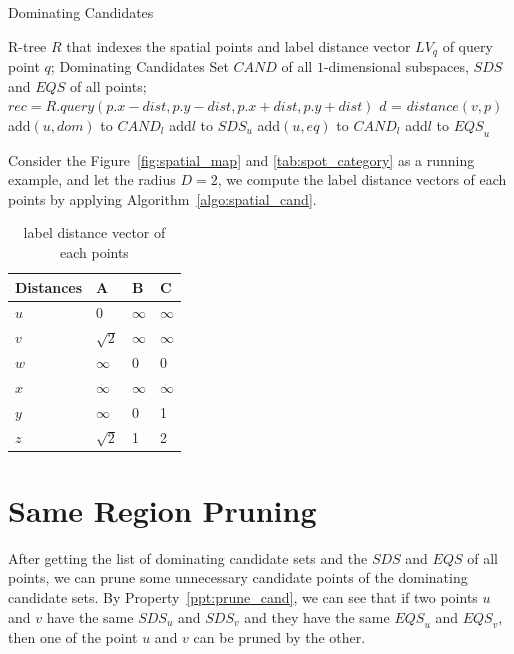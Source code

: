 \begin{algorithm}[H]
  \caption{Dominating Candidates}
  \label{algo:spatial_cand}
  \begin{algorithmic}[1]
  \show\LOOP
    \REQUIRE R-tree $R$ that indexes the spatial points and label distance vector $LV_q$ of query point $q$;
    \ENSURE Dominating Candidates Set $\mathit{CAND}$ of all $1$-dimensional subspaces, $\mathit{SDS}$ and $\mathit{EQS}$ of all points;
            \STATE $rec = R.query(p.x-dist, p.y-dist, p.x+dist, p.y+dist)$
                \STATE $d$ = $distance(v, p)$
                    \STATE add$(u, dom)$ to $\mathit{CAND}_l$
                    \STATE add$l$ to $\mathit{SDS}_u$
                \ENDIF
                    \STATE add$(u, eq)$ to $\mathit{CAND}_l$
                    \STATE add$l$ to $\mathit{EQS}_u$
                \ENDIF
            \ENDFOR
            
        \ENDFOR
    \ENDFOR
  \end{algorithmic}
\end{algorithm}

Consider the Figure~\ref{fig:spatial_map} and \ref{tab:spot_category} as a running example, and let the radius $D = 2$, we compute the label distance vectors of each points by applying Algorithm~\ref{algo:spatial_cand}.

\begin{table}[h]
    \centering
    \begin{tabular}{llll}
    \hline
    Distances & A & B & C \\ \hline
    $u$       & 0 & $\infty$ & $\infty$ \\ \hline
    $v$       & $\sqrt{2}$ & $\infty$ & $\infty$ \\ \hline
    $w$       & $\infty$ & 0 & 0 \\ \hline
    $x$       & $\infty$ & $\infty$ & $\infty$ \\ \hline
    $y$       & $\infty$ & 0 & 1 \\ \hline
    $z$       & $\sqrt{2}$ & 1 & 2 \\ \hline
    \end{tabular}
    \caption{\label{font-table} label distance vector of each points}
    \label{tab:lv_spatial}
\end{table}

\section{Same Region Pruning}
After getting the list of dominating candidate sets and the $\mathit{SDS}$ and $\mathit{EQS}$ of all points, we can prune some unnecessary candidate points of the dominating candidate sets. By Property~\ref{ppt:prune_cand}, we can see that if two points $u$ and $v$ have the same $\mathit{SDS}_u$ and $\mathit{SDS}_v$ and they have the same $\mathit{EQS}_u$ and $\mathit{EQS}_v$, then one of the point $u$ and $v$ can be pruned by the other.

